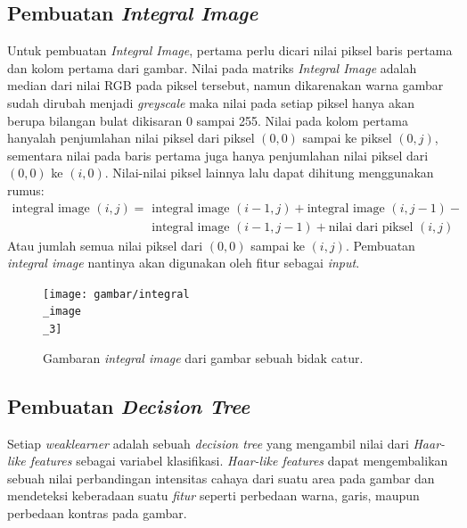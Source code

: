 \subsection{Pembuatan \textit{Integral Image}}

Untuk pembuatan \emph{Integral Image}, pertama perlu dicari nilai piksel
baris pertama dan kolom pertama dari gambar. Nilai pada matriks \emph{Integral Image} 
adalah median dari nilai RGB pada piksel tersebut, namun dikarenakan warna 
gambar sudah dirubah menjadi \emph{greyscale} maka nilai pada setiap piksel 
hanya akan berupa bilangan bulat dikisaran 0 sampai 255. Nilai pada kolom 
pertama hanyalah penjumlahan nilai piksel dari piksel $(0, 0)$ sampai ke piksel 
$(0, j)$, sementara nilai pada baris pertama juga hanya penjumlahan nilai 
piksel dari $(0, 0)$ ke  $(i, 0)$. Nilai-nilai piksel lainnya lalu dapat 
dihitung menggunakan rumus: 
\begin{equation}
  \begin{split}
    \text{integral image } (i,j) = {} & \text{integral image } (i-1,j) + \text{integral image } (i,j-1) - \\
    & \text{integral image } (i-1,j-1) + \text{nilai dari piksel } (i,j)
  \end{split}
\end{equation}
Atau jumlah semua nilai piksel dari $(0, 0)$ sampai ke $(i, j)$.
Pembuatan \emph{integral image} nantinya akan digunakan oleh fitur sebagai \textit{input}.

\begin{figure}[H]
  \centering{}
	\texttt{[image: gambar/integral\\\_image\\\_3]}
  \caption{Gambaran \emph{integral image} dari gambar sebuah bidak catur.}
\end{figure}

\subsection{Pembuatan \textit{Decision Tree}}

Setiap \emph{weaklearner} adalah sebuah \emph{decision tree} yang mengambil nilai 
dari \emph{Haar-like features} sebagai variabel klasifikasi.
\emph{Haar-like features} dapat mengembalikan 
sebuah nilai perbandingan intensitas cahaya dari suatu area pada gambar dan 
mendeteksi keberadaan suatu \emph{fitur} seperti 
perbedaan warna, garis, maupun perbedaan kontras pada gambar. 


